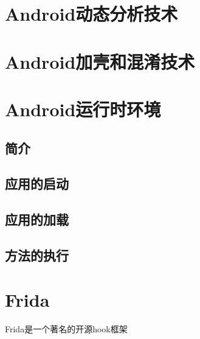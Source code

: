 \section{Android动态分析技术}


\section{Android加壳和混淆技术}
\section{Android运行时环境}
\subsection{简介}
\subsection{应用的启动}
\subsection{应用的加载}
\subsection{方法的执行}
\section{Frida}
Frida是一个著名的开源hook框架\juhao

